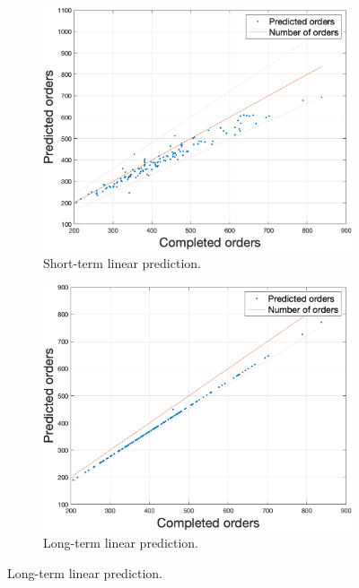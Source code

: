     \begin{figure}[h!]
        \centering
        \begin{subfigure}[b]{0.4\textwidth}
            \includegraphics[width=\textwidth]{figures/expCompLP.png}
            \caption{Short-term linear prediction.}
            \label{fig:stlpres}
        \end{subfigure}
        \hspace{0.1\textwidth}
        \begin{subfigure}[b]{0.4\textwidth}
            \includegraphics[width=\textwidth]{figures/expCompLTLP.png}
            \caption{Long-term linear prediction.}

\end{subfigure}
\end{figure}
